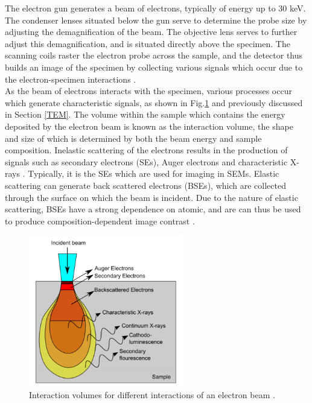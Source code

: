 The electron gun generates a beam of electrons, typically of energy up to 30 keV. The condenser lenses situated below the gun serve to determine the probe size by adjusting the demagnification of the beam. The objective lens serves to further adjust this demagnification, and is situated directly above the specimen. The scanning coils raster the electron probe across the sample, and the detector thus builds an image of the specimen by collecting various signals which occur due to the electron-specimen interactions \cite{Joy2006}.\\
As the beam of electrons interacts with the specimen, various processes occur which generate characteristic signals, as shown in Fig.\ref{2.5} and previously discussed in Section \ref{TEM}. The volume within the sample which contains the energy deposited by the electron beam is known as the interaction volume, the shape and size of which is determined by both the beam energy and sample composition. Inelastic scattering of the electrons results in the production of signals such as secondary electrons  (SEs), Auger electrons and characteristic X-rays \cite{DavidB.Williams2009}. Typically, it is the SEs which are used for imaging in SEMs. Elastic scattering can generate back scattered electrons  (BSEs), which are collected through the surface on which the beam is incident. Due to the nature of elastic scattering, BSEs have a strong dependence on atomic, and are can thus be used to produce composition-dependent image contrast \cite{Joy2006}.

\begin{figure}[h]
	\centering
	\includegraphics[width=0.6\textwidth]{Figs/Ch2/int.png}
	\caption {Interaction volumes for different interactions of an electron beam \cite{Puchtler2014}.}
	\label{2.5}
\end{figure}
\FloatBarrier



